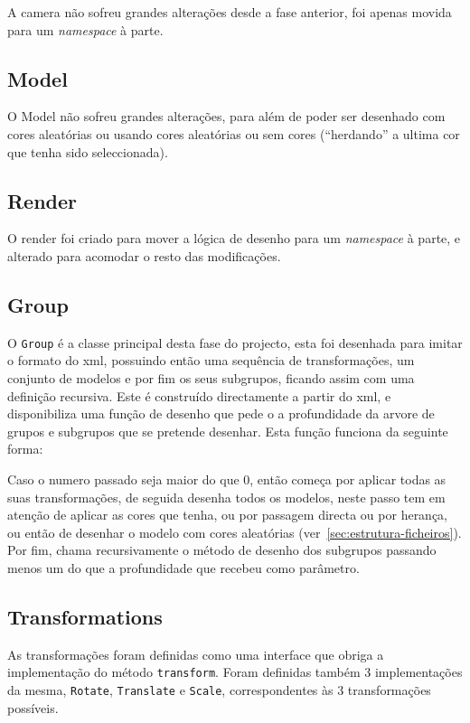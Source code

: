 \documentclass[a4paper]{article}
\begin{document}
A camera não sofreu grandes alterações desde a fase anterior, foi apenas movida
para um \textit{namespace} à parte.

\subsection{Model}

O Model não sofreu grandes alterações, para além de poder ser desenhado com cores aleatórias ou
usando cores aleatórias ou sem cores (``herdando'' a ultima cor que tenha sido
seleccionada).

\subsection{Render}

O render foi criado para mover a lógica de desenho para um \textit{namespace} à
parte, e alterado para acomodar o resto das modificações.

\subsection{Group}

O \texttt{Group} é a classe principal desta fase do projecto, esta foi
desenhada para imitar o formato do xml, possuindo então uma sequência de
transformações, um conjunto de modelos e por fim os seus subgrupos, ficando
assim com uma definição recursiva. Este é construído directamente a partir do
xml, e disponibiliza uma função de desenho que pede o a profundidade da arvore
de grupos e subgrupos que se pretende desenhar. Esta função funciona da
seguinte forma:

Caso o numero passado seja maior do que 0, então começa por aplicar todas as
suas transformações, de seguida desenha todos os modelos, neste passo tem em
atenção de aplicar as cores que tenha, ou por passagem directa ou por herança,
ou então de desenhar o modelo com cores aleatórias
(ver~\ref{sec:estrutura-ficheiros}). Por fim, chama recursivamente o método de
desenho dos subgrupos passando menos um do que a profundidade que recebeu como
parâmetro.

\subsection{Transformations}

As transformações foram definidas como uma interface que obriga a
implementação do método \texttt{transform}. Foram definidas também 3 implementações
da mesma, \texttt{Rotate}, \texttt{Translate} e \texttt{Scale}, correspondentes
às 3 transformações possíveis.
\end{document}
